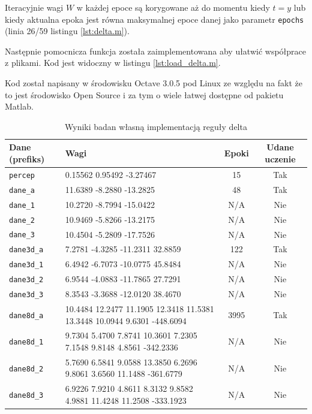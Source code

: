 \documentclass[pointlessnumbers, abstracton, headsepline, a4paper]{scrartcl}
\begin{document}
Iteracyjnie wagi $W$ w każdej epoce są korygowane aż do momentu kiedy $t = y$ lub kiedy aktualna epoka jest równa maksymalnej epoce danej jako parametr \texttt{epochs} (linia 26/59 listingu \ref{lst:delta.m}).

Następnie pomocnicza funkcja została zaimplementowana aby ułatwić współprace z plikami. Kod jest widoczny w listingu \ref{lst:load_delta.m}.

Kod został napisany w środowisku Octave 3.0.5 pod Linux ze względu na fakt że to jest środowisko Open Source i za tym o wiele łatwej dostępne od pakietu Matlab.

\begin{center}

\end{center}

\begin{table}[h!]
\centering
\begin{tabular}[t]{l|p{}|c|c}
Dane (prefiks) & Wagi & Epoki & Udane uczenie \\
\hline
\texttt{percep} & 0.15562   0.95492  -3.27467 & 15 & Tak \\
\texttt{dane\_a} & 11.6389   -8.2880  -13.2825 & 48 & Tak \\
\texttt{dane\_1} & 10.2720   -8.7994  -15.0422 & N/A & Nie \\
\texttt{dane\_2} & 10.9469   -5.8266  -13.2175 & N/A & Nie \\
\texttt{dane\_3} & 10.4504   -5.2809  -17.7526 & N/A & Nie  \\
\texttt{dane3d\_a} & 7.2781   -4.3285  -11.2311   32.8859 & 122 & Tak \\
\texttt{dane3d\_1} & 6.4942   -6.7073  -10.0775   45.8484 & N/A & Nie \\
\texttt{dane3d\_2} & 6.9544   -4.0883  -11.7865   27.7291 & N/A & Nie \\
\texttt{dane3d\_3} & 8.3543   -3.3688  -12.0120   38.4670 & N/A & Nie  \\
\texttt{dane8d\_a} & 10.4484    12.2477    11.1905    12.3418    11.5381    13.3448    10.0944     9.6301  -448.6094 & 3995 & Tak  \\
\texttt{dane8d\_1} & 9.7304     5.4700     7.8741    10.3601     7.2305     7.1548     9.8148    4.8561  -342.2336 & N/A & Nie \\
\texttt{dane8d\_2} & 5.7690     6.5841     9.0588    13.3850     6.2696     9.8061     3.6560    11.1488  -361.6779 & N/A & Nie \\
\texttt{dane8d\_3} & 6.9226     7.9210     4.8611     8.3132     9.8582     4.9881    11.4248    11.2508  -333.1923 & N/A & Nie \\
\end{tabular}
\caption{\label{tab:wyniki_bada}Wyniki badan własną implementacją reguły delta}
\end{table}
\end{document}
